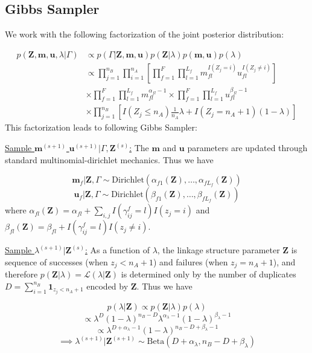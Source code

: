 \documentclass[12pt,letterpaper]{article}
\newcommand{\1}[1]{\mathbb{I}\!\left[#1\right]} %
\begin{document}
\hypertarget{posterior-sampling}{%
	\subsection{Gibbs Sampler}
	\label{gibbs_sampling}}
We work with the following factorization of the joint posterior distribution:

\begin{align*}
p(\mathbf{Z}, \mathbf{m}, \mathbf{u}, \lambda|\Gamma) &\propto p(\Gamma|\mathbf{Z}, \mathbf{m}, \mathbf{u}) p(\mathbf{Z} | \lambda) p(\mathbf{m}, \mathbf{u}) p(\lambda) \\
&\propto \prod_{j=1}^{n_B}  \prod_{i=1}^{n_A}\left[ \prod_{f=1}^{F}\prod_{l=1}^{L_f} m_{fl}^{I(Z_j = i)}u_{fl}^{I(Z_j \neq i)}\right] \\
&\times  \prod_{f=1}^{F}\prod_{l=1}^{L_f} m_{fl}^{\alpha_{fl} - 1}  \times\prod_{f=1}^{F}\prod_{l=1}^{L_f} u_{fl}^{\beta_{fl} - 1} \\
&\times \prod_{j=1}^{n_B} \left[I(Z_j \leq n_A)\frac{1}{n_A}\lambda + I(Z_j = n_A + 1)(1 - \lambda)\right]
\end{align*}
This factorization leads to following Gibbs Sampler:

\underline{Sample $\mathbf{m}^{(s+1)}$ $\mathbf{u}^{(s+1)}|\Gamma, \mathbf{Z}^{(s)}$:}
The \(\mathbf{m}\) and \(\mathbf{u}\) parameters are updated through
standard multinomial-dirichlet mechanics. Thus we have

\[\mathbf{m}_f|\mathbf{Z}, \Gamma \sim \text{Dirichlet}(\alpha_{f1}(\mathbf{Z}), \ldots, \alpha_{fL_f}(\mathbf{Z}))\]
\[\mathbf{u}_f|\mathbf{Z}, \Gamma \sim \text{Dirichlet}(\beta_{f1}(\mathbf{Z}), \ldots, \beta_{fL_f}(\mathbf{Z}))\]
where
\(\alpha_{fl}(\mathbf{Z})= \alpha_{fl} + \sum_{i,j} I(\gamma_{ij}^f = l) I(z_j = i)\)
and
\(\beta_{fl}(\mathbf{Z})= \beta_{fl} + I(\gamma_{ij}^f = l) I(z_j \neq i)\).

\underline{Sample $\lambda^{(s+1)}|\mathbf{Z}^{(s)}$:} As a function of
\(\lambda\), the linkage structure parameter \(\mathbf{Z}\) is sequence
of successes (when \(z_j < n_A + 1\)) and failures (when
\(z_j = n_A + 1\)), and therefore
\(p(\mathbf{Z}|\lambda) = \mathcal{L}(\lambda|\mathbf{Z})\) is
determined only by the number of duplicates
\(D = \sum_{i=1}^{n_B}\mathbf{1}_{z_j < n_A + 1}\) encoded by
\(\mathbf{Z}\). Thus we have

\[p(\lambda | \mathbf{Z}) \propto p(\mathbf{Z}|\lambda)p(\lambda)\]
\[\propto \lambda^D (1-\lambda)^{n_B - D} \lambda^{\alpha_{\lambda} -1} (1-\lambda)^{\beta_{\lambda} -1}\]
\[ \propto \lambda^{D + \alpha_{\lambda} - 1} (1-\lambda)^{n_B - D + \beta_{\lambda} -1}\]
\[\implies \lambda^{(s+1)}|\mathbf{Z}^{(s+1)} \sim \text{Beta}(D + \alpha_{\lambda}, n_B - D + \beta_{\lambda})\]
\end{document}
